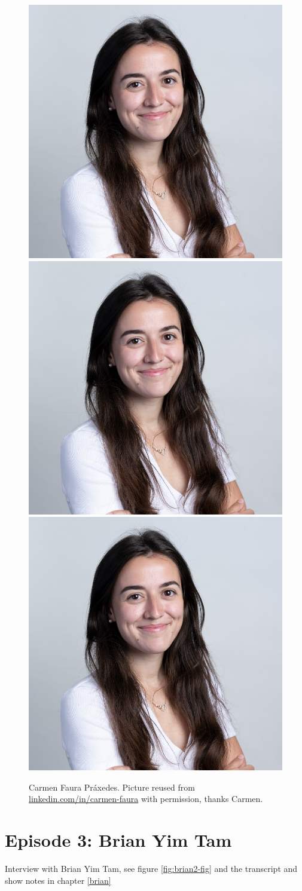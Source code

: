 \documentclass[
]{book}
\begin{document}
\begin{figure}
\includegraphics[width=0.33\linewidth]{images/carmen} \includegraphics[width=0.33\linewidth]{images/carmen} \includegraphics[width=0.33\linewidth]{images/carmen} \caption{Carmen Faura Práxedes. Picture reused from \href{https://www.linkedin.com/in/carmen-faura/}{linkedin.com/in/carmen-faura} with permission, thanks Carmen.}\label{fig:carmen2-fig}
\end{figure}

\hypertarget{ep3}{%
\section{Episode 3: Brian Yim Tam}\label{ep3}}

Interview with Brian Yim Tam, see figure \ref{fig:brian2-fig} and the transcript and show notes in chapter \ref{brian}
\end{document}
